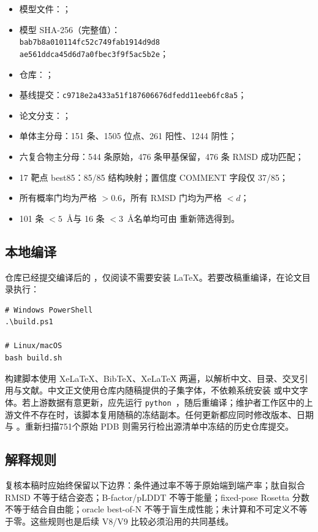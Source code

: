 \begin{itemize}
  \item 模型文件：；
  \item 模型 SHA-256（完整值）：\\
  \texttt{bab7b8a010114fc52c749fab1914d9d8}\\
  \texttt{ae561ddca45d6d7a0fbec3f9f5ac5b2e}；
  \item 仓库：；
  \item 基线提交：\texttt{c9718e2a\allowbreak{}433a51f1\allowbreak{}87606676\allowbreak{}dfedd11e\allowbreak{}eb6fc8a5}；
  \item 论文分支：；
  \item 单体主分母：151 条、1505 位点、261 阳性、1244 阴性；
  \item 六复合物主分母：544 条原始，476 条甲基保留，476 条 RMSD 成功匹配；
  \item 17 靶点 best85：85/85 结构映射；置信度 COMMENT 字段仅 37/85；
  \item 所有概率门均为严格 $>0.6$，所有 RMSD 门均为严格 $<d$；
  \item 101 条 $<5$~\AA 与 16 条 $<3$~\AA 名单均可由  重新筛选得到。
\end{itemize}

\subsection{本地编译}

仓库已经提交编译后的 ，仅阅读不需要安装 LaTeX。若要改稿重编译，在论文目录执行：

\begin{verbatim}
# Windows PowerShell
.\build.ps1

# Linux/macOS
bash build.sh
\end{verbatim}

构建脚本使用 XeLaTeX、BibTeX、XeLaTeX 两遍，以解析中文、目录、交叉引用与文献。中文正文使用仓库内随稿提供的子集字体，不依赖系统安装  或中文字体。若上游数据有意更新，应先运行 \texttt{python }，随后重编译；维护者工作区中的上游文件不存在时，该脚本复用随稿的冻结副本。任何更新都应同时修改版本、日期与 。重新扫描751个原始 PDB 则需另行检出源清单中冻结的历史仓库提交。

\subsection{解释规则}

复核本稿时应始终保留以下边界：条件通过率不等于原始端到端产率；肽自拟合 RMSD 不等于结合姿态；B-factor/pLDDT 不等于能量；fixed-pose Rosetta 分数不等于结合自由能；oracle best-of-N 不等于盲生成性能；未计算和不可定义不等于零。这些规则也是后续 V8/V9 比较必须沿用的共同基线。
